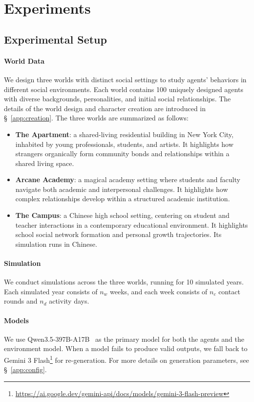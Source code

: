 
\section{Experiments}
\label{sec:experiments}

\subsection{Experimental Setup}
\label{sec:exp_setup}


\paragraph{World Data}
We design three worlds with distinct social settings to study agents' behaviors in different social environments.
Each world contains 100 uniquely designed agents with diverse backgrounds,
personalities, and initial social relationships.
The details of the world design and character creation are introduced in \S~\ref{app:creation}.
The three worlds are summarized as follows:
\begin{itemize}
  \item \textbf{The Apartment}: a shared-living residential building in New York City,
        inhabited by young professionals, students, and artists.
        It highlights how strangers organically form community bonds
        and relationships within a shared living space.
  \item \textbf{Arcane Academy}: a magical academy setting
        where students and faculty navigate both academic and interpersonal challenges.
        It highlights how complex relationships develop
        within a structured academic institution.
  \item \textbf{The Campus}: a Chinese high school setting,
        centering on student and teacher interactions in a contemporary educational environment.
        It highlights school social network formation
        and personal growth trajectories.
        Its simulation runs in Chinese.
\end{itemize}

\paragraph{Simulation}
We conduct simulations across the three worlds, running for 10 simulated years.
Each simulated year consists of $n_w$ weeks, and each week consists of $n_c$ contact rounds and $n_d$ activity days.

\paragraph{Models}
We use Qwen3.5-397B-A17B~\citep{qwen35} as the primary model
for both the agents and the environment model.
When a model fails to produce valid outputs,
we fall back to Gemini 3 Flash\footnote{\url{https://ai.google.dev/gemini-api/docs/models/gemini-3-flash-preview}} for re-generation.
For more details on generation parameters, see \S~\ref{app:config}.

